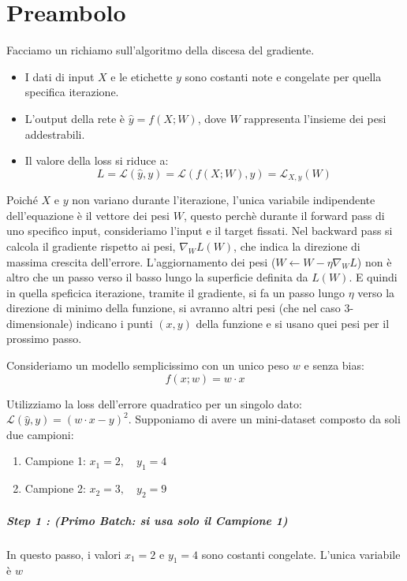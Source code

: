 \chapter{Preambolo}
Facciamo un richiamo sull'algoritmo della discesa del gradiente.
\begin{itemize}
    \item I dati di input $X$ e le etichette $y$ sono costanti note e congelate per quella specifica iterazione.
    \item L'output della rete è $\hat{y} = f(X; W)$, dove $W$ rappresenta l'insieme dei pesi addestrabili.
    \item Il valore della loss si riduce a:$$L = \mathcal{L}(\hat{y}, y) = \mathcal{L}(f(X; W), y) = \mathcal{L}_{X,y}(W)$$
\end{itemize}
Poiché $X$ e $y$ non variano durante l'iterazione, l'unica variabile indipendente dell'equazione è il vettore dei pesi $W$, questo perchè durante il forward pass di uno specifico input, consideriamo l'input e il target fissati.
Nel backward pass si calcola il gradiente rispetto ai pesi, $\nabla_W L(W)$, che indica la direzione di massima crescita dell'errore. L'aggiornamento dei pesi ($W \leftarrow W - \eta \nabla_W L$) non è altro che un passo verso il basso lungo la superficie definita da $L(W)$.
E quindi in quella speficica iterazione, tramite il gradiente, si fa un passo lungo $\eta$ verso la direzione di minimo della funzione, si avranno altri pesi (che nel caso 3-dimensionale) indicano i punti $(x,y)$ della funzione e si usano quei pesi per il prossimo passo.


Consideriamo un modello semplicissimo con un unico peso $w$ e senza bias:
$$f(x; w) = w \cdot x$$

Utilizziamo la loss dell'errore quadratico per un singolo dato: $\mathcal{L}(\hat{y}, y) = (w \cdot x - y)^2$.
Supponiamo di avere un mini-dataset composto da soli due campioni:

\begin{enumerate}
    \item Campione 1: $x_1 = 2, \quad y_1 = 4$
    \item Campione 2: $x_2 = 3, \quad y_2 = 9$
\end{enumerate}

\paragraph{Step 1 : (Primo Batch: si usa solo il Campione 1)}
In questo passo, i valori $x_1 = 2$ e $y_1 = 4$ sono costanti congelate. L'unica variabile è $w$

